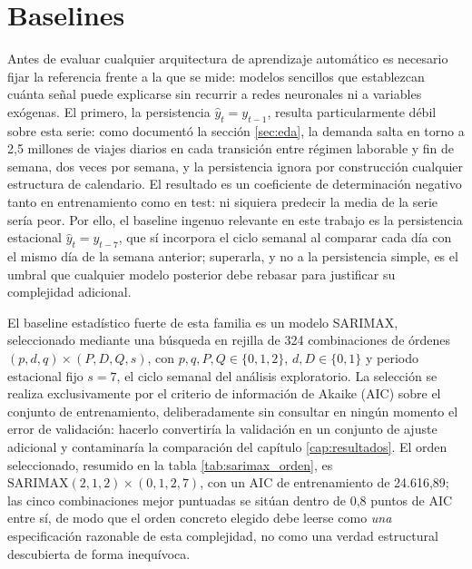 \section{Baselines}\label{sec:baselines}

Antes de evaluar cualquier arquitectura de aprendizaje automático es necesario fijar la
referencia frente a la que se mide: modelos sencillos que establezcan cuánta señal puede
explicarse sin recurrir a redes neuronales ni a variables exógenas. El primero, la
persistencia $\hat y_t = y_{t-1}$, resulta particularmente débil sobre esta serie: como
documentó la sección \ref{sec:eda}, la demanda salta en torno a 2,5 millones de viajes
diarios en cada transición entre régimen laborable y fin de semana, dos veces por semana,
y la persistencia ignora por construcción cualquier estructura de calendario. El
resultado es un coeficiente de determinación negativo tanto en entrenamiento como en
test: ni siquiera predecir la media de la serie sería peor. Por ello, el baseline ingenuo
relevante en este trabajo es la persistencia estacional $\hat y_t = y_{t-7}$, que sí
incorpora el ciclo semanal al comparar cada día con el mismo día de la semana anterior;
superarla, y no a la persistencia simple, es el umbral que cualquier modelo posterior debe
rebasar para justificar su complejidad adicional.

El baseline estadístico fuerte de esta familia es un modelo SARIMAX, seleccionado
mediante una búsqueda en rejilla de 324 combinaciones de órdenes
$(p,d,q)\times(P,D,Q,s)$, con $p,q,P,Q \in \{0,1,2\}$, $d,D \in \{0,1\}$ y periodo
estacional fijo $s=7$, el ciclo semanal del análisis exploratorio. La selección se realiza
exclusivamente por el criterio de información de Akaike (AIC) sobre el conjunto de
entrenamiento, deliberadamente sin consultar en ningún momento el error de validación:
hacerlo convertiría la validación en un conjunto de ajuste adicional y contaminaría la
comparación del capítulo \ref{cap:resultados}. El orden seleccionado, resumido en la tabla \ref{tab:sarimax_orden},
es $\text{SARIMAX}(2,1,2)\times(0,1,2,7)$, con un AIC de entrenamiento de 24.616,89; las
cinco combinaciones mejor puntuadas se sitúan dentro de 0,8 puntos de AIC entre sí, de
modo que el orden concreto elegido debe leerse como \emph{una} especificación razonable de
esta complejidad, no como una verdad estructural descubierta de forma inequívoca.

\begin{table}[htbp]
  \centering
  \small
  
  \caption{}
  \label{tab:sarimax_orden}
\end{table}


